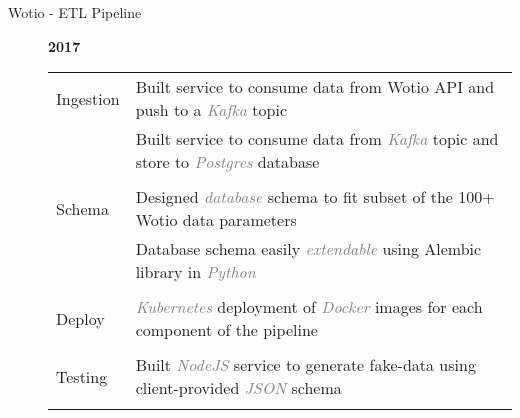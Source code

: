 \documentclass[12pt]{article}
\begin{document}
\begin{description}
\begin{description}
                \item[Wotio - ETL Pipeline] \hfill \textbf{2017}\\
                    \begin{tabular}{l|l}
				\\[-1.0mm]
                        Ingestion    & Built service to consume data from Wotio API and push to a \textcolor{gray}{\textit{Kafka}} topic\\
                                  & Built service to consume data from \textcolor{gray}{\textit{Kafka}} topic and store to \textcolor{gray}{\textit{Postgres}} database\\
				\\[-1.7mm]
                        Schema   & Designed \textcolor{gray}{\textit{database}} schema to fit subset of the 100+ Wotio data parameters\\
				  & Database schema easily \textcolor{gray}{\textit{extendable}} using Alembic library in \textcolor{gray}{\textit{Python}}\\
				\\[-1.7mm]
                        Deploy& \textcolor{gray}{\textit{Kubernetes}} deployment of \textcolor{gray}{\textit{Docker}} images for each component of the pipeline\\
				\\[-1.7mm]
                        Testing      & Built \textcolor{gray}{\textit{NodeJS}} service to generate fake-data using client-provided \textcolor{gray}{\textit{JSON}} schema\\
			        \\[-1.0mm]
                    \end{tabular}


\end{description}
\end{description}
\end{document}
